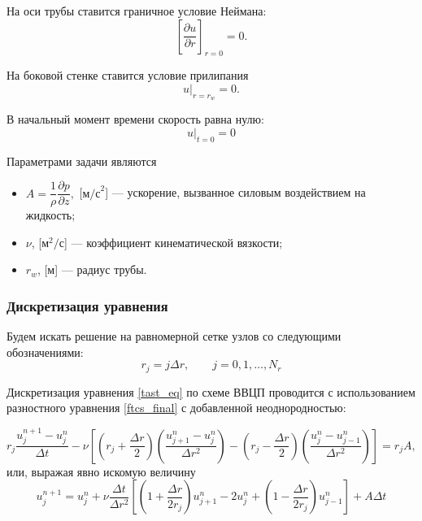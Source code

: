 На оси трубы ставится граничное условие Неймана:
\begin{equation} \label{Boundaries 1}
	\left[ \dfrac{\partial u}{\partial r} \right]_{r=0} = 0.
\end{equation}

На боковой стенке ставится условие прилипания
\begin{equation} \label{Boundaries 2}
	\left. u \right|_{r = r_w} = 0.
\end{equation}

В начальный момент времени скорость равна нулю:
\begin{equation} \label{Initials}
	\left. u \right|_{t=0} = 0
\end{equation}

Параметрами задачи являются
\begin{itemize}
	\item $A = \dfrac{1}{\rho} \dfrac{\partial p}{\partial z},$ [$\text{м/с}^2$] — ускорение, вызванное силовым воздействием на
	жидкость;
	\item $\nu$, [$\text{м}^2/\text{с}$] — коэффициент кинематической
	вязкости;
	\item $r_w$, [м] — радиус трубы.
\end{itemize}

\subsubsection{Дискретизация уравнения}

Будем искать решение на равномерной сетке узлов со следующими обозначениями:
\begin{equation} \label{mesh}
	r_j = j \Delta r, \qquad j = 0, 1, \dots, N_r
\end{equation}

Дискретизация уравнения \eqref{tast_eq} по схеме ВВЦП проводится с использованием разностного уравнения \eqref{ftcs_final} с добавленной неоднородностью:

\begin{equation} \label{task_ftcs}
	r_j \dfrac{u_j^{n+1} - u_j^n}{\Delta t}	 -
	\nu \left[ \left(r_j + \dfrac{\Delta r}{2}\right) \left( \dfrac{u_{j+1}^n - u_j^n}{\Delta r^2} \right) -
	\left(r_j - \dfrac{\Delta r}{2}\right) \left( \dfrac{u_{j}^n - u_{j-1}^n}{\Delta r^2} \right) \right] = r_jA,
\end{equation}
или, выражая явно искомую величину
\begin{equation} \label{task_ftcs2}
	u_j^{n+1} = u_j^n + \nu \dfrac{\Delta t}{\Delta r^2} \left[ \left( 1 + \dfrac{\Delta r}{2 r_j} \right)u_{j+1}^n - 2u_j^n + \left( 1 - \dfrac{\Delta r}{2 r_j} \right)u_{j-1}^n \right] + A\Delta t
\end{equation}

